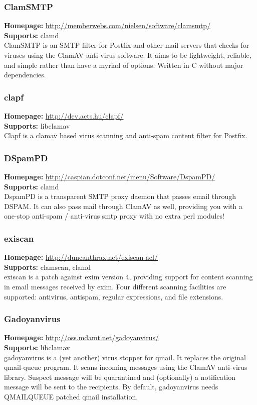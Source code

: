 \documentclass[a4paper,titlepage,12pt]{article}
\begin{document}
    \subsubsection{ClamSMTP}
    \textbf{Homepage:} \url{http://memberwebs.com/nielsen/software/clamsmtp/}\\
    \textbf{Supports:} clamd \\[4pt]
    ClamSMTP is an SMTP filter for Postfix and other mail servers that checks
    for viruses using the ClamAV anti-virus software. It aims to be lightweight,
    reliable, and simple rather than have a myriad of options. Written in C
    without major dependencies.

    \subsubsection{clapf}
    \textbf{Homepage:} \url{http://dev.acts.hu/clapf/}\\
    \textbf{Supports:} libclamav\\[4pt]
    Clapf is a clamav based virus scanning and anti-spam content filter for
    Postfix.

    \subsubsection{DSpamPD}
    \textbf{Homepage:} \url{http://caspian.dotconf.net/menu/Software/DspamPD/}\\
    \textbf{Supports:} clamd\\[4pt]
    DspamPD is a transparent SMTP proxy daemon that passes email through DSPAM.
    It can also pass mail through ClamAV as well, providing you with a one-stop
    anti-spam / anti-virus smtp proxy with no extra perl modules!

    \subsubsection{exiscan}
    \textbf{Homepage:} \url{http://duncanthrax.net/exiscan-acl/}\\
    \textbf{Supports:} clamscan, clamd\\[4pt]
    exiscan is a patch against exim version 4, providing support for content
    scanning in email messages received by exim. Four different scanning
    facilities are supported: antivirus, antispam, regular expressions, and
    file extensions.

    \subsubsection{Gadoyanvirus}
    \textbf{Homepage:} \url{http://oss.mdamt.net/gadoyanvirus/}\\
    \textbf{Supports:} libclamav\\[4pt]
    gadoyanvirus is a (yet another) virus stopper for qmail. It replaces the
    original qmail-queue program. It scans incoming messages using the ClamAV
    anti-virus library. Suspect message will be quarantined and (optionally)
    a notification message will be sent to the recipients. By default,
    gadoyanvirus needs QMAILQUEUE patched qmail installation. 
\end{document}
